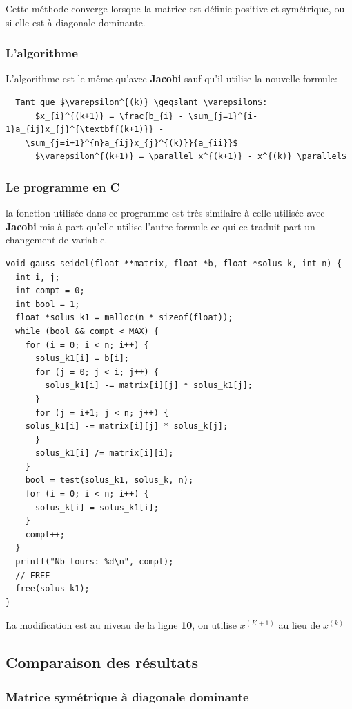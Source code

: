 \documentclass[a4paper]{article}
\begin{document}
Cette méthode converge lorsque la matrice est définie positive et symétrique, ou
si elle est à diagonale dominante.

\subsubsection{L'algorithme}

L'algorithme est le même qu'avec \textbf{Jacobi} sauf qu'il utilise la nouvelle formule:

\begin{lstlisting}
  Tant que $\varepsilon^{(k)} \geqslant \varepsilon$:
      $x_{i}^{(k+1)} = \frac{b_{i} - \sum_{j=1}^{i-1}a_{ij}x_{j}^{\textbf{(k+1)}} -
    \sum_{j=i+1}^{n}a_{ij}x_{j}^{(k)}}{a_{ii}}$
      $\varepsilon^{(k+1)} = \parallel x^{(k+1)} - x^{(k)} \parallel$
\end{lstlisting}

\subsubsection{Le programme en C}

la fonction utilisée dans ce programme est très similaire à celle utilisée avec
\textbf{Jacobi} mis à part qu'elle utilise l'autre formule ce qui ce traduit
part un changement de variable.

\begin{lstlisting}
void gauss_seidel(float **matrix, float *b, float *solus_k, int n) {
  int i, j;
  int compt = 0;
  int bool = 1;
  float *solus_k1 = malloc(n * sizeof(float));
  while (bool && compt < MAX) {
    for (i = 0; i < n; i++) {
      solus_k1[i] = b[i];
      for (j = 0; j < i; j++) {
        solus_k1[i] -= matrix[i][j] * solus_k1[j];
      }
      for (j = i+1; j < n; j++) {
	solus_k1[i] -= matrix[i][j] * solus_k[j];
      }
      solus_k1[i] /= matrix[i][i];
    }
    bool = test(solus_k1, solus_k, n);
    for (i = 0; i < n; i++) {
      solus_k[i] = solus_k1[i];
    }
    compt++;
  }
  printf("Nb tours: %d\n", compt);
  // FREE
  free(solus_k1);
}
\end{lstlisting}

La modification est au niveau de la ligne \textbf{10}, on utilise $x^{(K+1)}$ au
lieu de $x^{(k)}$

\subsection{Comparaison des résultats}

\subsubsection{Matrice symétrique à diagonale dominante}
\end{document}
